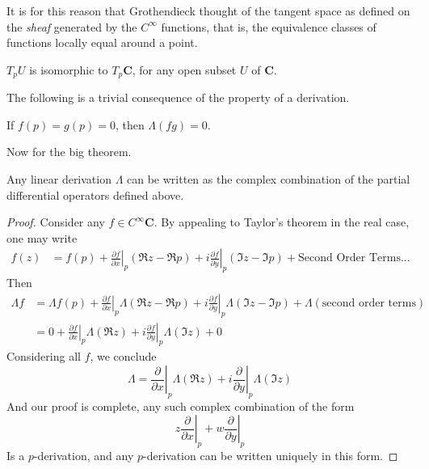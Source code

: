 It is for this reason that Grothendieck thought of the tangent space as defined on the {\it sheaf} generated by the $C^\infty$ functions, that is, the equivalence classes of functions locally equal around a point.

\begin{corollary}
    $T_p U$ is isomorphic to $T_p \mathbf{C}$, for any open subset $U$ of $\mathbf{C}$.
\end{corollary}

The following is a trivial consequence of the property of a derivation.

\begin{lemma}
    If $f(p) = g(p) = 0$, then $\Lambda (fg) = 0$.
\end{lemma}

Now for the big theorem.

\begin{theorem}
    Any linear derivation $\Lambda$ can be written as the complex combination of the partial differential operators defined above.
\end{theorem}
\begin{proof}
    Consider any $f \in C^\infty \mathbf{C}$. By appealing to Taylor's theorem in the real case, one may write
    \begin{align*} f(z) &= f(p) + \left.\frac{\partial f}{\partial x}\right|_p (\Re z - \Re p) + i \left. \frac{\partial f}{\partial y} \right|_p (\Im z - \Im p) + \text{Second Order Terms}...
    \end{align*}
    Then
    \begin{align*}
        \Lambda f &= \Lambda f(p) + \left.\frac{\partial f}{\partial x}\right|_p \Lambda(\Re z - \Re p) + i \left. \frac{\partial f}{\partial y} \right|_p \Lambda(\Im z - \Im p) + \Lambda(\text{second order terms})\\
        &= 0 + \left.\frac{\partial f}{\partial x}\right|_p \Lambda (\Re z) + i \left. \frac{\partial f}{\partial y} \right|_p \Lambda(\Im z) + 0
    \end{align*}
    Considering all $f$, we conclude
    \[ \Lambda = \left.\frac{\partial}{\partial x}\right|_p \Lambda (\Re z) + i \left. \frac{\partial}{\partial y} \right|_p \Lambda(\Im z) \]
    And our proof is complete, any such complex combination of the form
    \[ z \left.\frac{\partial}{\partial x}\right|_p + w \left. \frac{\partial}{\partial y} \right|_p \]
    Is a $p$-derivation, and any $p$-derivation can be written uniquely in this form.
\end{proof}

